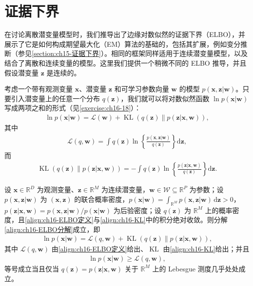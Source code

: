 \documentclass[../../main.tex]{subfiles}
\begin{document}
\section{证据下界}\label{section:ch16-证据下界}

在讨论离散潜变量模型时，我们推导出了边缘对数似然的证据下界（ELBO），并展示了它是如何构成期望最大化（EM）算法的基础的，包括其扩展，例如变分推断（参见\cref{section:ch15-证据下界}）。相同的框架同样适用于连续潜变量模型，以及结合了离散和连续变量的模型。这里我们提供一个稍微不同的 ELBO 推导，并且假设潜变量 $\bm{z}$ 是连续的。

考虑一个带有观测变量 $\bm{x}$、潜变量 $\bm{z}$ 和可学习参数向量 $\bm{w}$ 的模型 $p(\bm{x},\bm{z}|\bm{w})$。只要引入潜变量上的任意一个分布 $q(\bm{z})$，我们就可以将对数似然函数 $\ln p(\bm{x}|\bm{w})$ 写成两项之和的形式（见\cref{exercise:ch16-18}）：
\begin{align}
  \ln p(\bm{x}|\bm{w})=\mathcal{L}(\bm{w})+\operatorname{KL}\left(q(\bm{z})\|p(\bm{z}|\bm{x},\bm{w})\right),
  \label{align:ch16-ELBO分解}
\end{align}
其中
\begin{align}
  \mathcal{L}(q,\bm{w})=\int q(\bm{z})\ln\!\left\{\frac{p(\bm{x},\bm{z}|\bm{w})}{q(\bm{z})}\right\}\mathrm{d}\bm{z},
  \label{align:ch16-ELBO定义}
\end{align}
而
\begin{align}
  \operatorname{KL}\left(q(\bm{z})\|p(\bm{z}|\bm{x},\bm{w})\right)=-\int q(\bm{z})\ln\!\left\{\frac{p(\bm{z}|\bm{x},\bm{w})}{q(\bm{z})}\right\}\mathrm{d}\bm{z}.
  \label{align:ch16-KL}
\end{align}

\begin{proposition}[证据下界分解]\label{proposition:ch16-ELBO分解}
设 $\bm{x}\in\mathbb{R}^{D}$ 为观测变量、$\bm{z}\in\mathbb{R}^{M}$ 为连续潜变量，$\bm{w}\in\mathcal{W}\subseteq\mathbb{R}^{P}$ 为参数；设 $p(\bm{x},\bm{z}|\bm{w})$ 为 $(\bm{x},\bm{z})$ 的联合概率密度，$p(\bm{x}|\bm{w})=\int_{\mathbb{R}^{M}}p(\bm{x},\bm{z}|\bm{w})\,\mathrm{d}\bm{z}>0$，$p(\bm{z}|\bm{x},\bm{w})=p(\bm{x},\bm{z}|\bm{w})/p(\bm{x}|\bm{w})$ 为后验密度；设 $q(\bm{z})$ 为 $\mathbb{R}^{M}$ 上的概率密度，且\eqref{align:ch16-ELBO定义}与\eqref{align:ch16-KL}中的积分绝对收敛。则分解\eqref{align:ch16-ELBO分解}成立，即
\begin{align*}
  \ln p(\bm{x}|\bm{w})=\mathcal{L}(q,\bm{w})+\operatorname{KL}\left(q(\bm{z})\|p(\bm{z}|\bm{x},\bm{w})\right),
\end{align*}
其中 $\mathcal{L}(q,\bm{w})$ 由\eqref{align:ch16-ELBO定义}给出、$\operatorname{KL}$ 由\eqref{align:ch16-KL}给出；并且
\begin{align}
  \ln p(\bm{x}|\bm{w})\geqslant\mathcal{L}(q,\bm{w}),
  \label{align:ch16-ELBO不等式}
\end{align}
等号成立当且仅当 $q(\bm{z})=p(\bm{z}|\bm{x},\bm{w})$ 关于 $\mathbb{R}^{M}$ 上的 Lebesgue 测度几乎处处成立。
\end{proposition}
\end{document}
